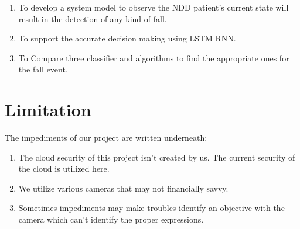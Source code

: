 \begin{enumerate}[label=\roman*]
    

    \item To develop a system model to observe the NDD patient’s current state will result in the detection of any kind of fall.


    \item To support the accurate decision making using LSTM RNN. 

    \item To Compare three classifier and algorithms to find the appropriate ones for the fall event. 
\end{enumerate}


\section{Limitation}
The impediments of our project are written underneath: 
    \begin{enumerate}[label=\roman*]
        \item The cloud security of this project isn't created by us. The current security of the cloud is utilized here.
        \item We utilize various cameras that may not financially savvy.
        \item Sometimes impediments may make troubles identify an objective with the camera which can't identify the proper expressions.
    \end{enumerate}


